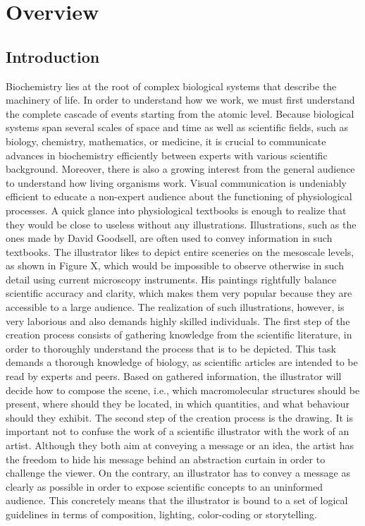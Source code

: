 \chapter{Overview}

\section{Introduction}

Biochemistry lies at the root of complex biological systems that describe the machinery of life.
In order to understand how we work, we must first understand the complete cascade of events starting from the atomic level.
Because biological systems span several scales of space and time as well as scientific fields, such as biology, chemistry, mathematics, or medicine, it is crucial to communicate advances in biochemistry efficiently between experts with various scientific background.
Moreover, there is also a growing interest from the general audience to understand how living organisms work.
Visual communication is undeniably efficient to educate a non-expert audience about the functioning of physiological processes.
A quick glance into physiological textbooks is enough to realize that they would be close to useless without any illustrations.
Illustrations, such as the ones made by David Goodsell, are often used to convey information in such textbooks.
The illustrator likes to depict entire sceneries on the mesoscale levels, as shown in Figure X, which would be impossible to observe otherwise in such detail using current microscopy instruments.
His paintings rightfully balance scientific accuracy and clarity, which makes them very popular because they are accessible to a large audience. 
The realization of such illustrations, however, is very laborious and also demands highly skilled individuals.
The first step of the creation process consists of gathering knowledge from the scientific literature, in order to thoroughly understand the process that is to be depicted.
This task demands a thorough knowledge of biology, as scientific articles are intended to be read by experts and peers.
Based on gathered information, the illustrator will decide how to compose the scene, i.e., which macromolecular structures should be present, where should they be located, in which quantities, and what behaviour should they exhibit.
The second step of the creation process is the drawing. 
It is important not to confuse the work of a scientific illustrator with the work of an artist.
Although they both aim at conveying a message or an idea, the artist has the freedom to hide his message behind an abstraction curtain in order to challenge the viewer.
On the contrary, an illustrator has to convey a message as clearly as possible in order to expose scientific concepts to an uninformed audience.
This concretely means that the illustrator is bound to a set of logical guidelines in terms of composition, lighting, color-coding or storytelling.

